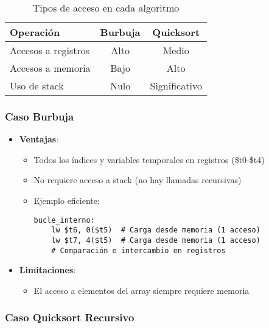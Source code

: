 \documentclass{article}
\begin{document}
\begin{table}[h]
\centering
\caption{Tipos de acceso en cada algoritmo}
\begin{tabular}{|l|c|c|}
\hline
\textbf{Operación} & \textbf{Burbuja} & \textbf{Quicksort} \\
\hline
Accesos a registros & Alto & Medio \\
\hline
Accesos a memoria & Bajo & Alto \\
\hline
Uso de stack & Nulo & Significativo \\
\hline
\end{tabular}
\end{table}

\subsubsection*{Caso Burbuja}

\begin{itemize}
\item \textbf{Ventajas}:
\begin{itemize}
\item Todos los índices y variables temporales en registros (\$t0-\$t4)
\item No requiere acceso a stack (no hay llamadas recursivas)
\item Ejemplo eficiente:
\begin{verbatim}
bucle_interno:
    lw $t6, 0($t5)  # Carga desde memoria (1 acceso)
    lw $t7, 4($t5)  # Carga desde memoria (1 acceso)
    # Comparación e intercambio en registros
\end{verbatim}
\end{itemize}

\item \textbf{Limitaciones}:
\begin{itemize}
\item El acceso a elementos del array siempre requiere memoria
\end{itemize}
\end{itemize}

\subsubsection*{Caso Quicksort Recursivo}
\end{document}
